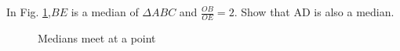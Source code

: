 %		
%
%
\begin{problem}
	In Fig. \ref{ch2_median_final},$BE$ is a median of $\Delta ABC$ and $\frac{OB}{OE} = 2$.  Show that AD is also a median. 
\end{problem}
%
\begin{figure}[!ht]
	\begin{center}
		
		\resizebox{\columnwidth}{!}{}
	\end{center}
	\caption{Medians meet at a point}
	\label{ch2_median_final}	
\end{figure}

